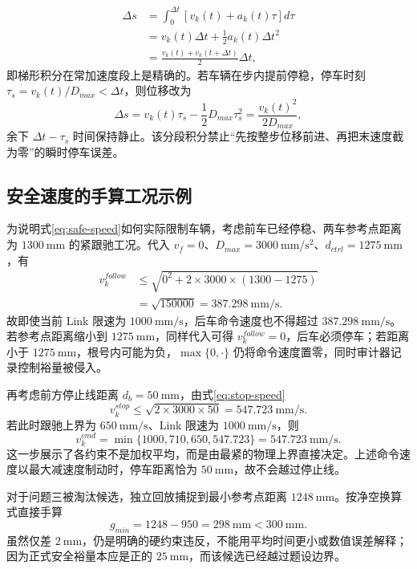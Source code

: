\documentclass[UTF8]{ctexart}
\begin{document}
\begin{align}
\Delta s&=\int_0^{\Delta t}\left[v_k(t)+a_k(t)\tau\right]d\tau\\
&=v_k(t)\Delta t+\frac12a_k(t)\Delta t^2\\
&=\frac{v_k(t)+v_k(t+\Delta t)}2\Delta t,
\end{align}
即梯形积分在常加速度段上是精确的。若车辆在步内提前停稳，停车时刻 $\tau_s=v_k(t)/D_{max}<\Delta t$，则位移改为
\begin{equation}\label{eq:within-step-stop}
\Delta s=v_k(t)\tau_s-\frac12D_{max}\tau_s^2
=\frac{v_k(t)^2}{2D_{max}},
\end{equation}
余下 $\Delta t-\tau_s$ 时间保持静止。该分段积分禁止“先按整步位移前进、再把末速度截为零”的瞬时停车误差。

\subsection{安全速度的手算工况示例}

为说明式\eqref{eq:safe-speed}如何实际限制车辆，考虑前车已经停稳、两车参考点距离为 $1300\ \mathrm{mm}$ 的紧跟驰工况。代入 $v_f=0$、$D_{max}=3000\ \mathrm{mm/s^2}$、$d_{ctrl}=1275\ \mathrm{mm}$，有
\begin{align}
v_k^{follow}
&\le\sqrt{0^2+2\times3000\times(1300-1275)}\\
&=\sqrt{150000}=387.298\ \mathrm{mm/s}.
\end{align}
故即使当前 Link 限速为 $1000\ \mathrm{mm/s}$，后车命令速度也不得超过 $387.298\ \mathrm{mm/s}$。若参考点距离缩小到 $1275\ \mathrm{mm}$，同样代入可得 $v_k^{follow}=0$，后车必须停车；若距离小于 $1275\ \mathrm{mm}$，根号内可能为负，$\max\{0,\cdot\}$ 仍将命令速度置零，同时审计器记录控制裕量被侵入。

再考虑前方停止线距离 $d_b=50\ \mathrm{mm}$，由式\eqref{eq:stop-speed}
\begin{equation}
v_k^{stop}\le\sqrt{2\times3000\times50}
=547.723\ \mathrm{mm/s}.
\end{equation}
若此时跟驰上界为 $650\ \mathrm{mm/s}$、Link 限速为 $1000\ \mathrm{mm/s}$，则
\begin{equation}
v_k^{cmd}=\min\{1000,710,650,547.723\}
=547.723\ \mathrm{mm/s}.
\end{equation}
这一步展示了各约束不是加权平均，而是由最紧的物理上界直接决定。上述命令速度以最大减速度制动时，停车距离恰为 $50\ \mathrm{mm}$，故不会越过停止线。

对于问题三被淘汰候选，独立回放捕捉到最小参考点距离 $1248\ \mathrm{mm}$。按净空换算式直接手算
\begin{equation}
g_{min}=1248-950=298\ \mathrm{mm}<300\ \mathrm{mm}.
\end{equation}
虽然仅差 $2\ \mathrm{mm}$，仍是明确的硬约束违反，不能用平均时间更小或数值误差解释；因为正式安全裕量本应是正的 $25\ \mathrm{mm}$，而该候选已经越过题设边界。
\end{document}

